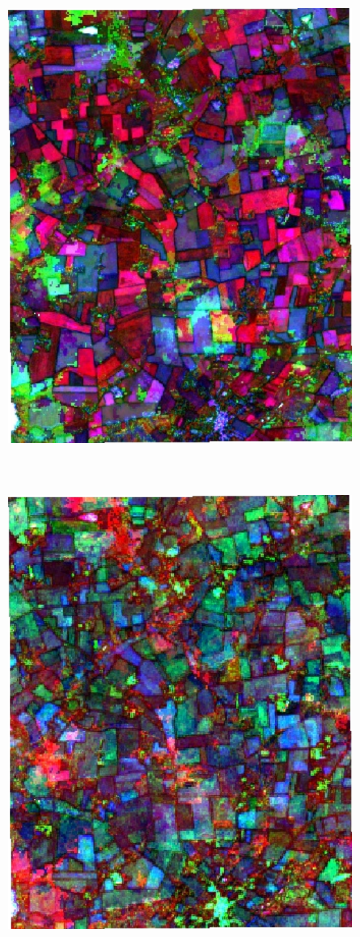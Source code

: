 \documentclass[journal,article,submit,pdftex,moreauthors]{Definitions/mdpi}
\providecommand{\DIFaddbeginFL}{} %
\providecommand{\DIFaddendFL}{} %
\providecommand{\DIFdelbeginFL}{} %
\providecommand{\DIFdelendFL}{} %
\begin{document}
\begin{figure}[H]
\begin{subfigure}[t]{0.23\linewidth}
\DIFdelendFL \DIFaddbeginFL \includegraphics[height=\linewidth,width=0.95\linewidth]{figures/aes_1_layer_mse_results/composites/composite_image_3011141.pdf}
    \DIFaddendFL \caption{}
	\DIFdelbeginFL %
\DIFdelendFL \DIFaddbeginFL \label{fig:color_map_d}
	\DIFaddendFL \end{subfigure}\\[0.2cm]
    \begin{subfigure}[t]{0.23\linewidth}
		\centering
	\DIFdelbeginFL %
\DIFdelendFL \DIFaddbeginFL \includegraphics[height=\linewidth,width=0.95\linewidth]{figures/aes_1_layer_mse_results/composites/composite_image_456657.pdf}

\end{subfigure}
\end{figure}
\end{document}
